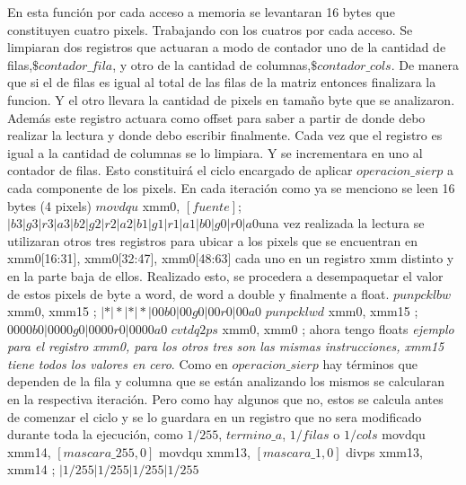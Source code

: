 \documentclass[a4paper]{article}
\begin{document}
En esta función por cada acceso a memoria se levantaran 16 bytes que constituyen cuatro pixels. Trabajando con los cuatros por cada acceso. Se limpiaran dos registros que actuaran a modo de contador uno de la cantidad de filas,$\$contador\_fila$, y otro de la cantidad de columnas,$\$contador\_cols$. De manera que si el de filas es igual al total de las filas de la matriz entonces finalizara la funcion. Y el otro llevara la cantidad de pixels en tamaño byte que se analizaron. Además este registro actuara como offset para saber a partir de donde debo realizar la lectura y donde debo escribir finalmente. Cada vez que el registro es igual a la cantidad de columnas se lo limpiara. Y se incrementara en uno al contador de filas. Esto constituirá el ciclo encargado de aplicar $operacion\_sierp$ a cada componente de los pixels. En cada iteración como ya se menciono se leen 16 bytes (4 pixels)\newline
$movdqu$ xmm0, $[fuente]$; $|b3|g3|r3|a3|b2|g2|r2|a2|b1|g1|r1|a1|b0|g0|r0|a0$\newline una vez realizada la lectura se utilizaran otros tres registros para ubicar a los pixels que se encuentran en xmm0[16:31], xmm0[32:47], xmm0[48:63] cada uno en un registro xmm distinto y en la parte baja de ellos. Realizado esto, se procedera a desempaquetar el valor de estos pixels de byte a word, de word a double y finalmente a float. \newline
$punpcklbw$ xmm0, xmm15 ; $|*|*|*|*|00b0|00g0|00r0|00a0$ \newline
$punpcklwd$ xmm0, xmm15 ; $0000b0|0000g0|0000r0|0000a0$ \newline 
$cvtdq2ps$ xmm0, xmm0 ; ahora tengo floats \newline
\textit{ejemplo para el registro xmm0, para los otros tres son las mismas instrucciones, xmm15 tiene todos los valores en cero}.\newline
Como en $operacion\_sierp$ hay términos que dependen de la fila y columna que se están analizando los mismos se calcularan en la respectiva iteración. Pero como hay algunos que no, estos se calcula antes de comenzar el ciclo y se lo guardara en un registro que no sera modificado durante toda la ejecución, como $1/255$, $termino\_a$, $1/filas$ o $1/cols$ \newline
movdqu xmm14, $[mascara\_255,0]$\newline
movdqu xmm13, $[mascara\_1,0]$\newline
divps xmm13, xmm14 ; $|1/255|1/255|1/255|1/255$\newline
\end{document}
